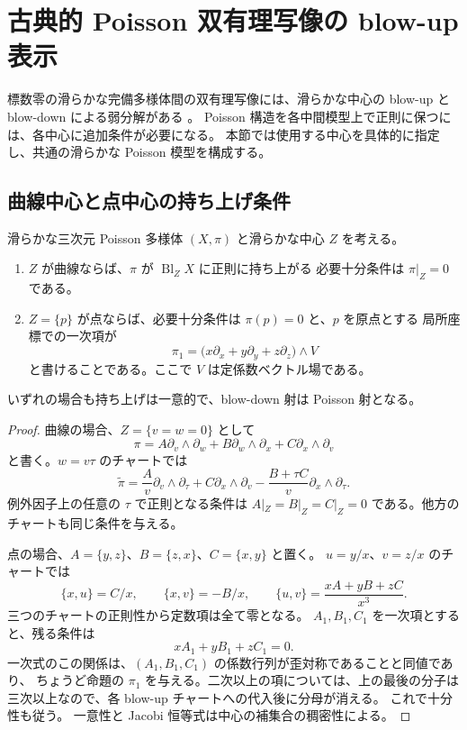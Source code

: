 \section{古典的 Poisson 双有理写像の blow-up 表示}
\label{sec:classical-factorizations}

標数零の滑らかな完備多様体間の双有理写像には、滑らかな中心の
blow-up と blow-down による弱分解がある
\cite[定理0.1.1]{AKMW}。
Poisson 構造を各中間模型上で正則に保つには、各中心に追加条件が必要になる。
本節では使用する中心を具体的に指定し、共通の滑らかな Poisson 模型を構成する。

\subsection{曲線中心と点中心の持ち上げ条件}

\begin{proposition}\label{prop:poisson-centres}
滑らかな三次元 Poisson 多様体 $(X,\pi)$ と滑らかな中心 $Z$ を考える。
\begin{enumerate}
\item $Z$ が曲線ならば、$\pi$ が $\operatorname{Bl}_Z X$ に正則に持ち上がる
必要十分条件は $\pi|_Z=0$ である。
\item $Z=\{p\}$ が点ならば、必要十分条件は $\pi(p)=0$ と、$p$ を原点とする
局所座標での一次項が
\[
 \pi_1=\bigl(x\partial_x+y\partial_y+z\partial_z\bigr)\wedge V
\]
と書けることである。ここで $V$ は定係数ベクトル場である。
\end{enumerate}
いずれの場合も持ち上げは一意的で、blow-down 射は Poisson 射となる。
\end{proposition}

\begin{proof}
曲線の場合、$Z=\{v=w=0\}$ として
\[
 \pi=A\partial_v\wedge\partial_w+
 B\partial_w\wedge\partial_x+C\partial_x\wedge\partial_v
\]
と書く。$w=v\tau$ のチャートでは
\[
 \widetilde\pi=\frac{A}{v}\partial_v\wedge\partial_\tau+
 C\partial_x\wedge\partial_v-
 \frac{B+\tau C}{v}\partial_x\wedge\partial_\tau.
\]
例外因子上の任意の $\tau$ で正則となる条件は
$A|_Z=B|_Z=C|_Z=0$ である。他方のチャートも同じ条件を与える。

点の場合、$A=\{y,z\}$、$B=\{z,x\}$、$C=\{x,y\}$ と置く。
$u=y/x$、$v=z/x$ のチャートでは
\[
 \{x,u\}=C/x,\qquad \{x,v\}=-B/x,\qquad
 \{u,v\}=\frac{xA+yB+zC}{x^3}.
\]
三つのチャートの正則性から定数項は全て零となる。
$A_1,B_1,C_1$ を一次項とすると、残る条件は
\[
 xA_1+yB_1+zC_1=0.
\]
一次式のこの関係は、$(A_1,B_1,C_1)$ の係数行列が歪対称であることと同値であり、
ちょうど命題の $\pi_1$ を与える。二次以上の項については、上の最後の分子は
三次以上なので、各 blow-up チャートへの代入後に分母が消える。
これで十分性も従う。
一意性と Jacobi 恒等式は中心の補集合の稠密性による。
\end{proof}

